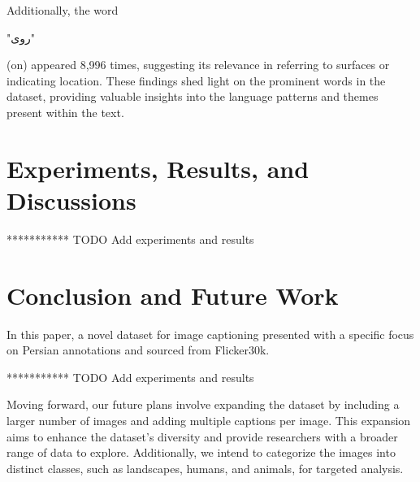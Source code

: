 \documentclass[runningheads]{llncs}
\begin{document}
Additionally, the word \begin{farsi} \arabicfont\small "روی"\end{farsi} (on) appeared 8,996 times, suggesting its relevance in referring to surfaces or indicating location. These findings shed light on the prominent words in the dataset, providing valuable insights into the language patterns and themes present within the text.

\section{Experiments, Results, and Discussions}

*********** TODO Add experiments and results

\section{Conclusion and Future Work}
In this paper, a novel dataset for image captioning presented with a specific focus on Persian annotations and sourced from Flicker30k.

*********** TODO Add experiments and results

Moving forward, our future plans involve expanding the dataset by including a larger number of images and adding multiple captions per image. This expansion aims to enhance the dataset's diversity and provide researchers with a broader range of data to explore. Additionally, we intend to categorize the images into distinct classes, such as landscapes, humans, and animals, for targeted analysis.
\end{document}
